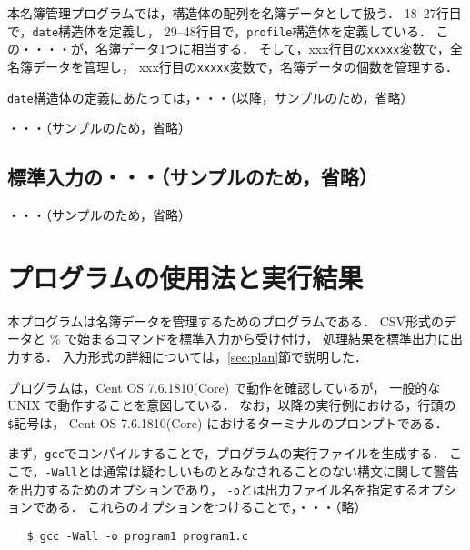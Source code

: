 本名簿管理プログラムでは，構造体の配列を名簿データとして扱う．
18--27行目で，\verb|date|構造体を定義し，
29--48行目で，\verb|profile|構造体を定義している．
この・・・・が，名簿データ1つに相当する．
そして，xxx行目の\verb|xxxxx|変数で，全名簿データを管理し，
xxx行目の\verb|xxxxx|変数で，名簿データの個数を管理する．

\verb|date|構造体の定義にあたっては，・・・（以降，サンプルのため，省略）

・・・（サンプルのため，省略）

\subsection{標準入力の・・・（\textbf{サンプルのため，省略}）}

・・・（サンプルのため，省略）


\section{プログラムの使用法と実行結果}\label{sec:howresult}

本プログラムは名簿データを管理するためのプログラムである．
CSV形式のデータと \% で始まるコマンドを標準入力から受け付け，
処理結果を標準出力に出力する．
入力形式の詳細については，\ref{sec:plan}節で説明した．

プログラムは，Cent OS 7.6.1810(Core) で動作を確認しているが，
一般的な UNIX で動作することを意図している．
なお，以降の実行例における，行頭の\verb|$|記号は，
Cent OS 7.6.1810(Core) におけるターミナルのプロンプトである．

まず，\verb|gcc|でコンパイルすることで，プログラムの実行ファイルを生成する．
ここで，\verb|-Wall|とは通常は疑わしいものとみなされることのない構文に関して警告を出力するためのオプションであり，
\verb|-o|とは出力ファイル名を指定するオプションである．
これらのオプションをつけることで，・・・（略）

{\fontsize{10pt}{11pt} \selectfont
 \begin{verbatim}
   $ gcc -Wall -o program1 program1.c
 \end{verbatim}
}

